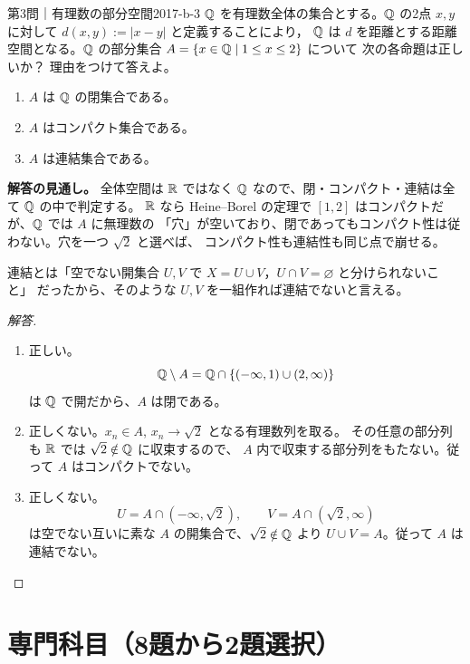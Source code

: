 \begin{problem}{第3問｜有理数の部分空間}{2017-b-3}
$\mathbb{Q}$ を有理数全体の集合とする。$\mathbb{Q}$ の2点 $x,y$ に対して $d(x,y):=|x-y|$ と定義することにより，
$\mathbb{Q}$ は $d$ を距離とする距離空間となる。$\mathbb{Q}$ の部分集合 $A=\{x\in\mathbb{Q}\mid1\le x\le2\}$ について
次の各命題は正しいか？ 理由をつけて答えよ。
\begin{enumerate}
  \item[(1)] $A$ は $\mathbb{Q}$ の閉集合である。
  \item[(2)] $A$ はコンパクト集合である。
  \item[(3)] $A$ は連結集合である。
\end{enumerate}
\end{problem}
\begin{memo*}
\textbf{解答の見通し。}
全体空間は $\mathbb{R}$ ではなく $\mathbb{Q}$ なので、閉・コンパクト・連結は全て $\mathbb{Q}$ の中で判定する。
$\mathbb{R}$ なら Heine--Borel の定理で $[1,2]$ はコンパクトだが、$\mathbb{Q}$ では $A$ に無理数の
「穴」が空いており、閉であってもコンパクト性は従わない。穴を一つ $\sqrt2$ と選べば、
コンパクト性も連結性も同じ点で崩せる。

連結とは「空でない開集合 $U,V$ で $X=U\cup V$，$U\cap V=\varnothing$ と分けられないこと」
だったから、そのような $U,V$ を一組作れば連結でないと言える。
\end{memo*}
\begin{proof}[解答]
\begin{enumerate}
  \item[(1)] 正しい。
  \[
  \mathbb{Q}\setminus A=\mathbb{Q}\cap\{(-\infty,1)\cup(2,\infty)\}
  \]
  は $\mathbb{Q}$ で開だから、$A$ は閉である。

  \item[(2)] 正しくない。$x_n\in A$, $x_n\to\sqrt2$ となる有理数列を取る。
  その任意の部分列も $\mathbb{R}$ では $\sqrt2\notin\mathbb{Q}$ に収束するので、
  $A$ 内で収束する部分列をもたない。従って $A$ はコンパクトでない。

  \item[(3)] 正しくない。
  \[
  U=A\cap(-\infty,\sqrt2),\qquad
  V=A\cap(\sqrt2,\infty)
  \]
  は空でない互いに素な $A$ の開集合で、$\sqrt2\notin\mathbb{Q}$ より
  $U\cup V=A$。従って $A$ は連結でない。
\end{enumerate}
\end{proof}

\section{専門科目（8題から2題選択）}

